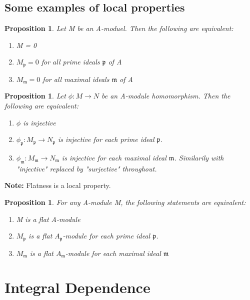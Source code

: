 \documentclass[]{report}
\newtheorem{prop}[theorem]{Proposition}
\begin{document}
\section{Some examples of local properties}

\begin{prop}
    Let M be an A-moduel. Then the following are equivalent:
    \begin{enumerate}
        \item M = 0
        \item $M_\mathfrak{p} = 0$ for all prime ideals $\mathfrak{p}$ of A
        \item $M_\mathfrak{m} = 0$ for all maximal ideals $\mathfrak{m}$ of A
    \end{enumerate}
\end{prop}

\begin{prop}
    Let $\phi: M\rightarrow N$ be an A-module homomorphism. Then the following are equivalent:
    \begin{enumerate}
        \item $\phi$ is injective
        \item $\phi_\mathfrak{p}: M_\mathfrak{p} \rightarrow N_\mathfrak{p}$ is injective for each prime ideal $\mathfrak{p}$. 
        \item $\phi_\mathfrak{m}: M_\mathfrak{m} \rightarrow N_\mathfrak{m}$ is injective for each maximal ideal $\mathfrak{m}$. 
Similarily with "injective" replaced by "surjective" throughout. 
    \end{enumerate}
\end{prop}

\textbf{Note:} Flatness is a local property.

\begin{prop}
    For any A-module M, the following statements are equivalent:
    \begin{enumerate}
        \item M is a flat A-module
        \item $M_\mathfrak{p}$ is a flat $A_\mathfrak{p}$-module for each prime ideal $\mathfrak{p}$.
        \item $M_\mathfrak{m}$ is a flat $A_\mathfrak{m}$-module for each maximal ideal $\mathfrak{m}$
    \end{enumerate}
\end{prop}


\chapter{Integral Dependence}

\begin{thebibliography}{9}
\end{thebibliography}
\end{document}
